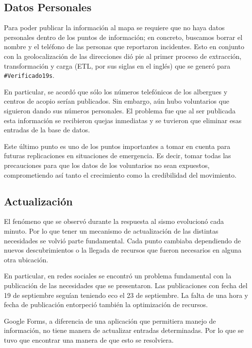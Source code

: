 \documentclass[12pt,spanish,oneside,breaklinks]{book}
\begin{document}
\subsection{Datos Personales}
\label{sec:org0178856}

Para poder publicar la información al mapa se requiere que no haya datos personales dentro de los puntos de información; en concreto, buscamos borrar el nombre y el teléfono de las personas que reportaron incidentes. Esto en conjunto con la geolocalización de las direcciones dió pie al primer proceso de extracción, transformación y carga (ETL, por sus siglas en el inglés) que se generó para \texttt{\#Verificado19s}.

En particular, se acordó que sólo los números telefónicos de los albergues y centros de acopio serían publicados. Sin embargo, aún hubo voluntarios que siguieron dando sus números personales. El problema fue que al ser publicada esta información se recibieron quejas inmediatas y se tuvieron que eliminar esas entradas de la base de datos.

Este último punto es uno de los puntos importantes a tomar en cuenta para futuras replicaciones en situaciones de emergencia. Es decir,  tomar todas las precauciones para que los datos de los voluntarios no sean expuestos, comprometiendo así tanto el crecimiento como la credibilidad del movimiento.

\subsection{Actualización}
\label{sec:org6103da2}

El fenómeno que se observó durante la respuesta al sismo evolucionó cada minuto. Por lo que tener un mecanismo de actualización de las distintas necesidades se volvió parte fundamental. Cada punto cambiaba dependiendo de nuevos descubrimientos o la llegada de recursos que fueron necesarios en alguna otra ubicación.

En particular, en redes sociales se encontró un problema fundamental con la publicación de las necesidades que se presentaron. Las publicaciones con fecha del 19 de septiembre seguían teniendo eco el 23 de septiembre. La falta de una hora y fecha de publicación entorpeció también la optimización de recursos.

Google Forms, a diferencia de una aplicación que permitiera manejo de información, no tiene manera de actualizar  entradas determinadas. Por lo que se tuvo que encontrar una manera de que esto se resolviera.
\end{document}
